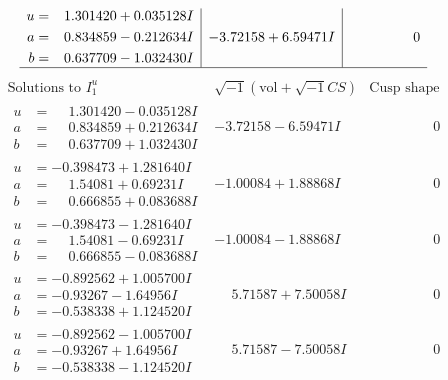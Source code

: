 \documentclass[1p]{elsarticle_modified}
\theoremstyle{definition}
\newcommand{\I}{\sqrt{-1}}
\begin{document}
$$\begin{array}{c|c|c}
\begin{aligned}
u &= \phantom{-}1.301420 + 0.035128 I \\
a &= \phantom{-}0.834859 - 0.212634 I \\
b &= \phantom{-}0.637709 - 1.032430 I\end{aligned}
 & -3.72158 + 6.59471 I & \phantom{-0.000000 } 0\\
 \hline 
 \end{array}$$\newpage$$\begin{array}{c|c|c}  
\text{Solutions to }I^u_{1}& \I (\text{vol} + \sqrt{-1}CS) & \text{Cusp shape}\\
 \hline 
\begin{aligned}
u &= \phantom{-}1.301420 - 0.035128 I \\
a &= \phantom{-}0.834859 + 0.212634 I \\
b &= \phantom{-}0.637709 + 1.032430 I\end{aligned}
 & -3.72158 - 6.59471 I & \phantom{-0.000000 } 0 \\ \hline\begin{aligned}
u &= -0.398473 + 1.281640 I \\
a &= \phantom{-}1.54081 + 0.69231 I \\
b &= \phantom{-}0.666855 + 0.083688 I\end{aligned}
 & -1.00084 + 1.88868 I & \phantom{-0.000000 } 0 \\ \hline\begin{aligned}
u &= -0.398473 - 1.281640 I \\
a &= \phantom{-}1.54081 - 0.69231 I \\
b &= \phantom{-}0.666855 - 0.083688 I\end{aligned}
 & -1.00084 - 1.88868 I & \phantom{-0.000000 } 0 \\ \hline\begin{aligned}
u &= -0.892562 + 1.005700 I \\
a &= -0.93267 - 1.64956 I \\
b &= -0.538338 + 1.124520 I\end{aligned}
 & \phantom{-}5.71587 + 7.50058 I & \phantom{-0.000000 } 0 \\ \hline\begin{aligned}
u &= -0.892562 - 1.005700 I \\
a &= -0.93267 + 1.64956 I \\
b &= -0.538338 - 1.124520 I\end{aligned}
 & \phantom{-}5.71587 - 7.50058 I & \phantom{-0.000000 } 0 \\ \hline\begin{aligned}

\end{aligned}
\end{array}$$
\end{document}
